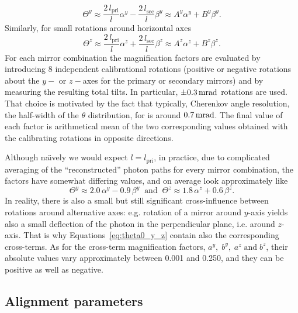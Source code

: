 \begin{equation*}
  \varTheta^y  \approx \dfrac{2\,l_{\mathrm{pri}}}{l}\alpha^y
                     - \dfrac{2\,l_{\mathrm{sec}}}{l} \beta^y
               \approx                            A^y\alpha^y
                                                + B^y \beta^y.
\end{equation*}
Similarly, for small rotations around horizontal axes
\begin{equation*}
\varTheta^z  \approx \dfrac{2\,l_{\mathrm{pri}}}{l}\alpha^z
                   + \dfrac{2\,l_{\mathrm{sec}}}{l} \beta^z
             \approx                            A^z\alpha^z
                                              + B^z \beta^z.
\end{equation*}
For each mirror combination the magnification factors are evaluated by
introducing 8 independent calibrational rotations (positive or negative
rotations about the $y-$ or $z-$axes for the primary or secondary mirrors) and
by measuring the resulting total tilts. In particular, $\pm0.3\rm \,mrad$ rotations
are used. That choice is motivated by the fact that typically, Cherenkov angle
resolution, the half-width of the $\theta$ distribution, for \richtwo is around
$0.7\rm \,mrad$. The final value of each factor is arithmetical mean of the two
corresponding values obtained with the calibrating rotations in opposite
directions.

Although na\"{\i}vely we would expect $l=l_{\mathrm{pri}}$, in practice, due to
complicated averaging of the ``reconstructed'' photon paths for every mirror
combination, the factors have somewhat differing values, and on average look
approximately like
\begin{equation*}
  \varTheta^y  \approx 2.0\,\alpha^y-0.9\,\beta^y
  \;\;\text{and}\;\;
  \varTheta^z  \approx 1.8\,\alpha^z+0.6\,\beta^z.
\end{equation*}
In reality, there is also a small but still significant cross-influence between
rotations around alternative axes: e.g. rotation of a mirror around $y$-axis
yields also a small deflection of the photon in the perpendicular plane, i.e.
around $z$-axis. That is why Equations~\ref{eq:theta0_y_z}
contain also the corresponding cross-terms. As for the cross-term magnification
factors, $a^y,\;b^y,\;a^z\;\text{and}\;b^z$, their absolute values vary
approximately between 0.001 and 0.250, and they can be positive as well as
negative.


\subsection{Alignment parameters}

